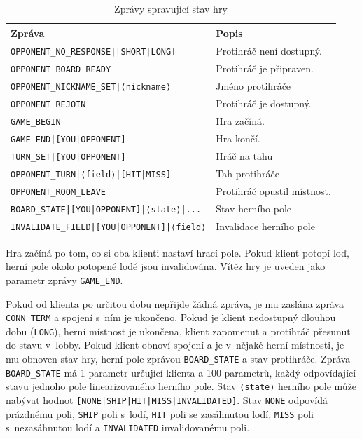 \documentclass[a4paper, 12pt]{report}
\begin{document}
\begin{table}[]
\begin{center}
\caption{\label{tab:state-updates}Zprávy spravující stav hry}
\begin{tabular}{|l|l|}
\hline
\textbf{Zpráva}                                  & \textbf{Popis}                      \\ \hline
\texttt{OPPONENT\_NO\_RESPONSE|{[}SHORT|LONG{]}} & Protihráč není dostupný.            \\ \hline
\texttt{OPPONENT\_BOARD\_READY}                  & Protihráč je připraven. \\ \hline
\texttt{OPPONENT\_NICKNAME\_SET|⟨nickname⟩}      & Jméno protihráče                    \\ \hline
\texttt{OPPONENT\_REJOIN}                        & Protihráč je dostupný.              \\ \hline
\texttt{GAME\_BEGIN}                             & Hra začíná.                         \\ \hline
\texttt{GAME\_END|{[}YOU|OPPONENT{]}}            & Hra končí.                          \\ \hline
\texttt{TURN\_SET|{[}YOU|OPPONENT{]}}            & Hráč na tahu                        \\ \hline
\texttt{OPPONENT\_TURN|⟨field⟩|{[}HIT|MISS{]}}   & Tah protihráče            \\ \hline
\texttt{OPPONENT\_ROOM\_LEAVE}                   & Protihráč opustil místnost.   \\ \hline
\texttt{BOARD\_STATE|{[}YOU|OPPONENT{]}|⟨state⟩|...} & Stav herního pole                   \\ \hline
\texttt{INVALIDATE\_FIELD|{[}YOU|OPPONENT{]}|⟨field⟩}               & Invalidace herního pole                   \\ \hline
\end{tabular}
\end{center}
\end{table}

Hra začíná po tom, co si oba klienti nastaví hrací pole. Pokud klient potopí loď, herní pole okolo potopené lodě jsou invalidována. Vítěz hry je uveden jako parametr zprávy \texttt{GAME\_END}.

Pokud od klienta po určitou dobu nepřijde žádná zpráva, je mu zaslána zpráva \texttt{CONN\_TERM} a spojení s~ním je ukončeno. Pokud je klient nedostupný dlouhou dobu (\texttt{LONG}), herní místnost je ukončena, klient zapomenut a protihráč přesunut do stavu v~lobby. Pokud klient obnoví spojení a je v~nějaké herní místnosti, je mu obnoven stav hry, herní pole zprávou \texttt{BOARD\_STATE} a stav protihráče. Zpráva \texttt{BOARD\_STATE} má 1 parametr určující klienta a 100 parametrů, každý odpovídající stavu jednoho pole linearizovaného herního pole. Stav \texttt{⟨state⟩} herního pole může nabývat hodnot \texttt{[NONE|SHIP|HIT|MISS|INVALIDATED]}. Stav \texttt{NONE} odpovídá prázdnému poli, \texttt{SHIP} poli s~lodí, \texttt{HIT} poli se zasáhnutou lodí, \texttt{MISS} poli s~nezasáhnutou lodí a \texttt{INVALIDATED} invalidovanému poli.
\end{document}

